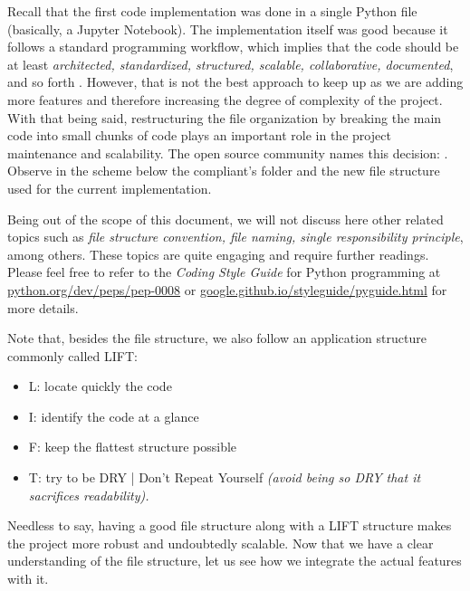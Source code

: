 Recall that the first code implementation was done in a single Python file (basically, a Jupyter Notebook). The implementation itself was good because it follows a standard programming workflow, which implies that the code should be at least \textit{architected, standardized, structured, scalable, collaborative, documented}, and so forth \cite{rflorent2019veibm1, smashingmagazine}. However, that is not the best approach to keep up as we are adding more features and therefore increasing the degree of complexity of the project. With that being said, restructuring the file organization by breaking the main code into small chunks of code plays an important role in the project maintenance and scalability. The open source community names this decision: . Observe in the scheme below the compliant's folder and the new file structure used for the current implementation.



\noindent
Being out of the scope of this document, we will not discuss here other related topics such as \textit{file structure convention, file naming, single responsibility principle}, among others. These topics are quite engaging and require further readings. Please feel free to refer to the \emph{Coding Style Guide} for Python programming at \href{https://www.python.org/dev/peps/pep-0008/}{python.org/dev/peps/pep-0008} or \href{http://google.github.io/styleguide/pyguide.html}{google.github.io/styleguide/pyguide.html} for more details.

Note that, besides the file structure, we also follow an application structure commonly called LIFT:
\begin{itemize}
    \item L: locate quickly the code
    \item I: identify the code at a glance
    \item F: keep the flattest structure possible
    \item T: try to be DRY | Don't Repeat Yourself \textit{(avoid being so DRY that it sacrifices readability).}
\end{itemize}
\noindent
Needless to say, having a good file structure along with a LIFT structure makes the project more robust and undoubtedly scalable. Now that we have a clear understanding of the file structure, let us see how we integrate the actual features with it.

